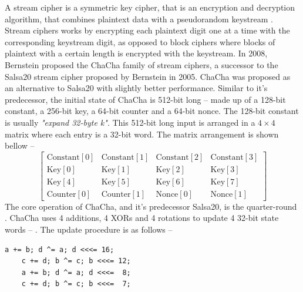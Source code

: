 \documentclass[a4paper]{cas-sc}
\begin{document}
A stream cipher is a symmetric key cipher, that is an encryption and decryption algorithm, that combines plaintext data with a pseudorandom keystream \cite{robshaw1995stream}. Stream ciphers works by encrypting each plaintext digit one at a time with the corresponding keystream digit, as opposed to block ciphers where blocks of plaintext with a certain length is encrypted with the keystream. In 2008, Bernstein proposed the ChaCha family of stream ciphers, a successor to the Salsa20 stream cipher \cite{bernstein2005salsa20} proposed by Bernstein in 2005. ChaCha was proposed as an alternative to Salsa20 \cite{bernstein2008chachaFamily} with slightly better performance. Similar to it's predecessor, the initial state of ChaCha is 512-bit long -- made up of a 128-bit constant, a 256-bit key, a 64-bit counter and a 64-bit nonce. The 128-bit constant is usually \textit{"expand 32-byte k"}. This 512-bit long input is arranged in a $4\times4$ matrix where each entry is a 32-bit word. The matrix arrangement is shown bellow --
\begin{equation}\label{initialState}
    \left[
        \begin{array}{cccc}
            \text{Constant}[0] & \text{Constant}[1] & \text{Constant}[2] & \text{Constant}[3] \\
            \text{Key}[0]      & \text{Key}[1]      & \text{Key}[2]      & \text{Key}[3]      \\
            \text{Key}[4]      & \text{Key}[5]      & \text{Key}[6]      & \text{Key}[7]      \\
            \text{Counter}[0]  & \text{Counter}[1]  & \text{Nonce}[0]    & \text{Nonce}[1]
        \end{array}
        \right]
\end{equation}
The core operation of ChaCha, and it's predecessor Salsa20, is the quarter-round . ChaCha uses 4 additions, 4 XORs and 4 rotations to update 4 32-bit state words -- . The update procedure is as follows --
\begin{lstlisting}[basicstyle=\ttfamily,frame=none]
    a += b; d ^= a; d <<<= 16;
    c += d; b ^= c; b <<<= 12;
    a += b; d ^= a; d <<<=  8;
    c += d; b ^= c; b <<<=  7;
\end{lstlisting}
\end{document}

